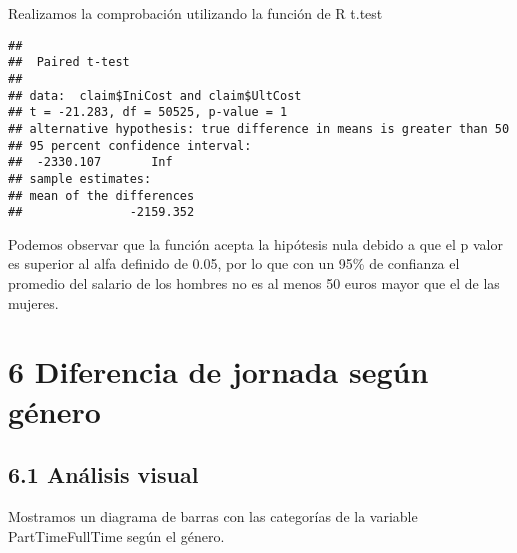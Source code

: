 \documentclass[
  a4paper]{article}
\newenvironment{Shaded}{\begin{snugshade}}{\end{snugshade}}
\newcommand{\AttributeTok}[1]{\textcolor[rgb]{0.77,0.63,0.00}{#1}}
\newcommand{\ConstantTok}[1]{\textcolor[rgb]{0.00,0.00,0.00}{#1}}
\newcommand{\DecValTok}[1]{\textcolor[rgb]{0.00,0.00,0.81}{#1}}
\newcommand{\FunctionTok}[1]{\textcolor[rgb]{0.00,0.00,0.00}{#1}}
\newcommand{\NormalTok}[1]{#1}
\newcommand{\SpecialCharTok}[1]{\textcolor[rgb]{0.00,0.00,0.00}{#1}}
\newcommand{\StringTok}[1]{\textcolor[rgb]{0.31,0.60,0.02}{#1}}
\begin{document}
Realizamos la comprobación utilizando la función de R t.test

\begin{Shaded}
\end{Shaded}

\begin{verbatim}
## 
##  Paired t-test
## 
## data:  claim$IniCost and claim$UltCost
## t = -21.283, df = 50525, p-value = 1
## alternative hypothesis: true difference in means is greater than 50
## 95 percent confidence interval:
##  -2330.107       Inf
## sample estimates:
## mean of the differences 
##               -2159.352
\end{verbatim}

Podemos observar que la función acepta la hipótesis nula debido a que el
p valor es superior al alfa definido de 0.05, por lo que con un 95\% de
confianza el promedio del salario de los hombres no es al menos 50 euros
mayor que el de las mujeres.

\hypertarget{diferencia-de-jornada-seguxfan-guxe9nero}{%
\section{6 Diferencia de jornada según
género}\label{diferencia-de-jornada-seguxfan-guxe9nero}}

\hypertarget{anuxe1lisis-visual-2}{%
\subsection{6.1 Análisis visual}\label{anuxe1lisis-visual-2}}

Mostramos un diagrama de barras con las categorías de la variable
PartTimeFullTime según el género.
\end{document}
